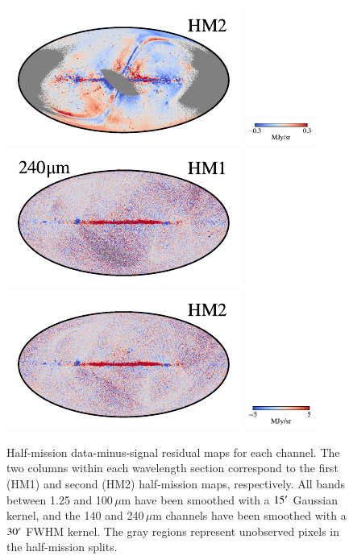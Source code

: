 \documentclass[twocolumn]{aa}
\begin{document}
\begin{figure}[t]
    \includegraphics[width=0.22\linewidth]{figs/compare_res/cosmoglobe_res_05b.pdf}%
    \includegraphics[width=23mm,angle=90]{figs/compare_res/cbar_05.pdf}\hspace*{3mm}
    \includegraphics[width=0.22\linewidth]{figs/compare_res/cosmoglobe_res_10a.pdf}%
    \includegraphics[width=0.22\linewidth]{figs/compare_res/cosmoglobe_res_10b.pdf}%
    \includegraphics[width=23mm,angle=90]{figs/compare_res/cbar_10.pdf}%
    \caption{Half-mission data-minus-signal residual maps for each
      channel. The two columns within each wavelength section
      correspond to the first (HM1) and second (HM2) half-mission
      maps, respectively. All bands between 1.25 and 100$\,\mu$m have
      been smoothed with a $15\arcm$ Gaussian kernel, and the 140 and
      240\,$\mu$m channels have been smoothed with a $30\arcm$ FWHM
      kernel. The gray regions represent unobserved pixels in the
      half-mission splits.}
    \label{fig:half-mission-res2}
\end{figure}
\end{document}
